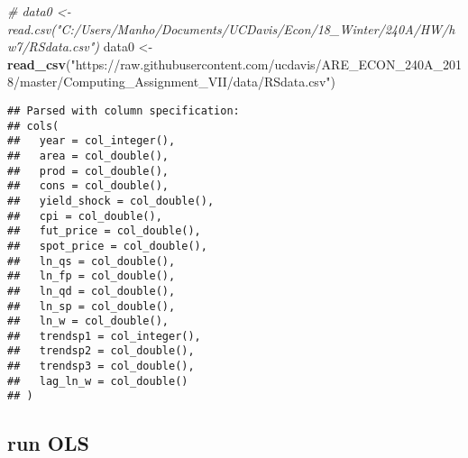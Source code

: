 \documentclass[]{article}
\newenvironment{Shaded}{\begin{snugshade}}{\end{snugshade}}
\newcommand{\KeywordTok}[1]{\textcolor[rgb]{0.13,0.29,0.53}{\textbf{{#1}}}}
\newcommand{\DataTypeTok}[1]{\textcolor[rgb]{0.13,0.29,0.53}{{#1}}}
\newcommand{\StringTok}[1]{\textcolor[rgb]{0.31,0.60,0.02}{{#1}}}
\newcommand{\CommentTok}[1]{\textcolor[rgb]{0.56,0.35,0.01}{\textit{{#1}}}}
\newcommand{\NormalTok}[1]{{#1}}
\begin{document}
\begin{Shaded}
\begin{Highlighting}[]
\CommentTok{# data0 <- read.csv("C:/Users/Manho/Documents/UCDavis/Econ/18_Winter/240A/HW/hw7/RSdata.csv")}
\NormalTok{data0 <-}\StringTok{ }\KeywordTok{read_csv}\NormalTok{(}\StringTok{"https://raw.githubusercontent.com/ucdavis/ARE_ECON_240A_2018/master/Computing_Assignment_VII/data/RSdata.csv"}\NormalTok{)}
\end{Highlighting}
\end{Shaded}

\begin{verbatim}
## Parsed with column specification:
## cols(
##   year = col_integer(),
##   area = col_double(),
##   prod = col_double(),
##   cons = col_double(),
##   yield_shock = col_double(),
##   cpi = col_double(),
##   fut_price = col_double(),
##   spot_price = col_double(),
##   ln_qs = col_double(),
##   ln_fp = col_double(),
##   ln_qd = col_double(),
##   ln_sp = col_double(),
##   ln_w = col_double(),
##   trendsp1 = col_integer(),
##   trendsp2 = col_double(),
##   trendsp3 = col_double(),
##   lag_ln_w = col_double()
## )
\end{verbatim}

\begin{Shaded}
\end{Shaded}

\subsection{run OLS}\label{run-ols}
\end{document}
